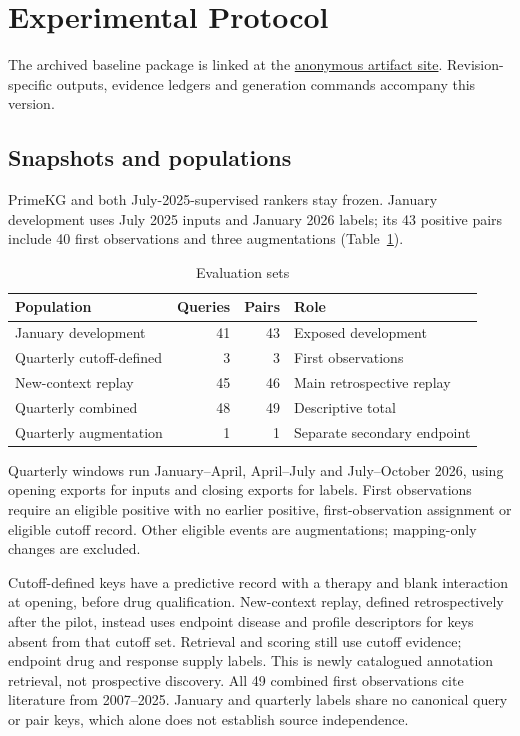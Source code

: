 \section{Experimental Protocol}
\label{sec:eval}
\ifx\artifacturl\empty\else
The archived baseline package is linked at the \href{\artifacturl}{anonymous artifact site}. Revision-specific outputs, evidence ledgers and generation commands accompany this version.
\par
\fi
\subsection{Snapshots and populations}
PrimeKG and both July-2025-supervised rankers stay frozen. January development uses July 2025 inputs and January 2026 labels; its 43 positive pairs include 40 first observations and three augmentations (Table~\ref{tab:datasets}).

\begin{table}[t]
\caption{Evaluation sets}
\label{tab:datasets}
\centering\small
\setlength{\tabcolsep}{4pt}
\begin{tabular}{@{}lrrl@{}}
\toprule
Population & Queries & Pairs & Role \\
\midrule
January development & 41 & 43 & Exposed development \\
Quarterly cutoff-defined & 3 & 3 & First observations \\
New-context replay & 45 & 46 & Main retrospective replay \\
Quarterly combined & 48 & 49 & Descriptive total \\
Quarterly augmentation & 1 & 1 & Separate secondary endpoint \\
\bottomrule
\end{tabular}
\end{table}

Quarterly windows run January--April, April--July and July--October 2026, using opening exports for inputs and closing exports for labels. First observations require an eligible positive with no earlier positive, first-observation assignment or eligible cutoff record. Other eligible events are augmentations; mapping-only changes are excluded.

Cutoff-defined keys have a predictive record with a therapy and blank interaction at opening, before drug qualification. New-context replay, defined retrospectively after the pilot, instead uses endpoint disease and profile descriptors for keys absent from that cutoff set. Retrieval and scoring still use cutoff evidence; endpoint drug and response supply labels. This is newly catalogued annotation retrieval, not prospective discovery. All 49 combined first observations cite literature from 2007--2025. January and quarterly labels share no canonical query or pair keys, which alone does not establish source independence.

